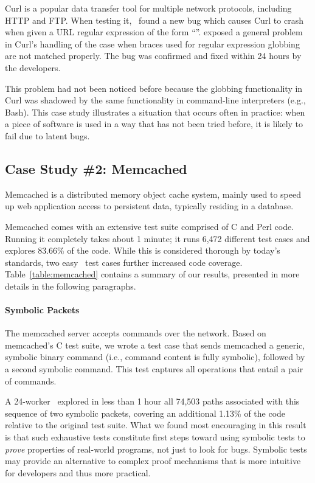 Curl is a popular data transfer tool for multiple network protocols, including HTTP and FTP.  When testing it, \cnine\ found a new bug which causes Curl to crash when given a URL regular expression of the form ``''. \cnine exposed a general problem in Curl's handling of the case when braces used for regular expression globbing are not matched properly.  The bug was confirmed and fixed within 24 hours by the developers. 

This problem had not been noticed before because the globbing functionality in Curl was shadowed by the same functionality in command-line interpreters (e.g., Bash).  This case study illustrates a situation that occurs often in practice: when a piece of software is used in a way that has not been tried before, it is likely to fail due to latent bugs.

\subsection{Case Study \#2: Memcached}
\label{sec:eval:memcached}

Memcached is a distributed memory object cache system, mainly used to speed up web application access to persistent
data, typically residing in a database. %

Memcached comes with an extensive test suite comprised of C and Perl code. Running it completely takes about 1 minute; it runs 6,472 different test cases  and explores $83.66\%$ of the code. While this is considered thorough by today's standards, two easy \cnine\ test cases further increased code coverage. Table~\ref{table:memcached} contains a summary of our results, presented in more details in the following paragraphs.


\paragraph{Symbolic Packets}

The memcached server accepts commands over the network. Based on memcached's C test suite, we wrote a test case that sends memcached a generic, symbolic binary command (i.e., command content is fully symbolic), followed by a second symbolic command. This test captures all operations that entail a pair of commands.

A 24-worker \cnine\ explored in less than 1 hour all 74,503 paths associated with this sequence of two symbolic packets, covering an additional 1.13\% of the  code relative to the original test suite.  What we found most encouraging in this result is that such exhaustive tests constitute first steps toward using symbolic tests to \emph{prove} properties of real-world programs, not just to look for bugs.  Symbolic tests may provide an alternative to complex proof mechanisms that is more intuitive for developers and thus more practical.

